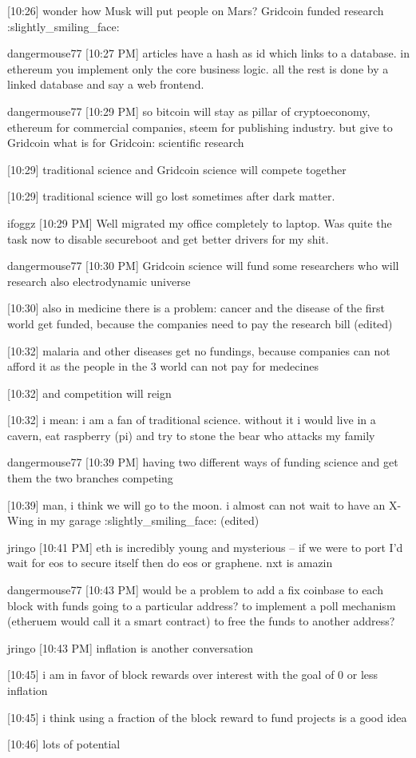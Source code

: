 {[10:26] 
wonder how Musk will put people on Mars? Gridcoin funded research :slightly_smiling_face:


dangermouse77 [10:27 PM] 
articles have a hash as id which links to a database. in ethereum you implement only the core business logic. all the rest is done by a linked database and say a web frontend.


dangermouse77 [10:29 PM] 
so bitcoin will stay as pillar of cryptoeconomy, ethereum for commercial companies, steem for publishing industry. but give to Gridcoin what is for Gridcoin: scientific research


[10:29] 
traditional science and Gridcoin science will compete together


[10:29] 
traditional science will go lost sometimes after dark matter.


ifoggz
[10:29 PM] 
Well migrated my office completely to laptop. Was quite the task now to disable secureboot and get better drivers for my shit.


dangermouse77 [10:30 PM] 
Gridcoin science will fund some researchers who will research also electrodynamic universe


[10:30] 
also in medicine there is a problem: cancer and the disease of the first world get funded, because the companies need to pay the research bill (edited)


[10:32] 
malaria and other diseases get no fundings, because companies can not afford it as the people in the 3 world can not pay for medecines


[10:32] 
and competition will reign


[10:32] 
i mean: i am a fan of traditional science. without it i would live in a cavern, eat raspberry (pi) and try to stone the bear who attacks my family


dangermouse77 [10:39 PM] 
having two different ways of funding science and get them the two branches competing


[10:39] 
man, i think we will go to the moon. i almost can not wait to have an X-Wing in my garage :slightly_smiling_face: (edited)


jringo [10:41 PM] 
eth is incredibly young and mysterious -- if we were to port I'd wait for eos to secure itself then do eos or graphene.  nxt is amazin


dangermouse77 [10:43 PM] 
would be a problem to add a fix coinbase to each block with funds going to a particular address? to implement a poll mechanism (etheruem would call it a smart contract) to free the funds to another address?


jringo [10:43 PM] 
inflation is another conversation


[10:45] 
i am in favor of block rewards over interest with the goal of 0 or less inflation


[10:45] 
i think using a fraction of the block reward to fund projects is a good idea


[10:46] 
lots of potential
}
